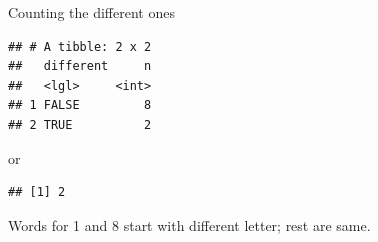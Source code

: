 \documentclass[ignorenonframetext,]{beamer}
\newenvironment{Shaded}{\begin{snugshade}}{\end{snugshade}}
\newcommand{\DataTypeTok}[1]{\textcolor[rgb]{0.13,0.29,0.53}{#1}}
\newcommand{\KeywordTok}[1]{\textcolor[rgb]{0.13,0.29,0.53}{\textbf{#1}}}
\newcommand{\NormalTok}[1]{#1}
\newcommand{\OperatorTok}[1]{\textcolor[rgb]{0.81,0.36,0.00}{\textbf{#1}}}
\newcommand{\StringTok}[1]{\textcolor[rgb]{0.31,0.60,0.02}{#1}}
\begin{document}
\begin{frame}[fragile]{Counting the different ones}
\protect\hypertarget{counting-the-different-ones}{}

\small

\begin{Shaded}
\end{Shaded}

\begin{verbatim}
## # A tibble: 2 x 2
##   different     n
##   <lgl>     <int>
## 1 FALSE         8
## 2 TRUE          2
\end{verbatim}

\normalsize

or

\small

\begin{Shaded}
\end{Shaded}

\begin{verbatim}
## [1] 2
\end{verbatim}

\normalsize

Words for 1 and 8 start with different letter; rest are same.

\end{frame}
\end{document}
